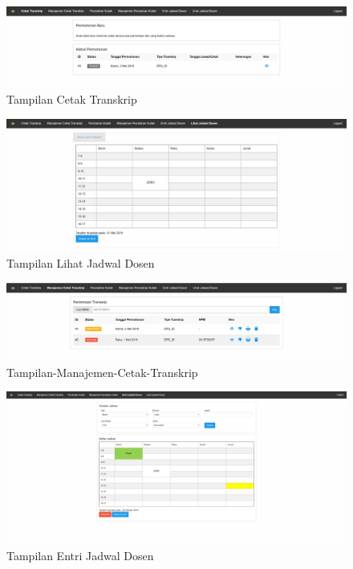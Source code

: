 \documentclass[a4paper,twoside]{article}
\begin{document}
	\begin{figure}[h]
		\includegraphics [scale=0.5] {Tampilan-Cetak-Transkrip.PNG}
		\caption{Tampilan Cetak Transkrip}
	\end{figure}
	
	\begin{figure}[h]
		\includegraphics [scale=0.5] {Tampilan-Lihat-Jadwal-Dosen.PNG}
		\caption{Tampilan Lihat Jadwal Dosen}
	\end{figure}
	
	\begin{figure}[h]
		\includegraphics [scale=0.5] {Tampilan-Manajemen-Cetak-Transkrip.PNG}
		\caption{Tampilan-Manajemen-Cetak-Transkrip}
	\end{figure}
	
	\begin{figure}[h]
		\includegraphics [scale=0.5] {Tampilan-Entri-Jadwal-Dosen.PNG}
		\caption{Tampilan Entri Jadwal Dosen}
	\end{figure}
	
\end{document}
